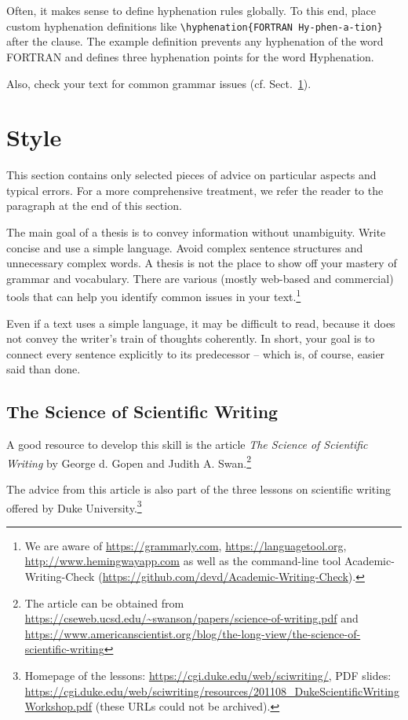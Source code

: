 Often, it makes sense to define hyphenation rules globally. To this end, place custom hyphenation definitions like \verb|\hyphenation{FORTRAN Hy-phen-a-tion}| after the \verb|| clause. The example definition prevents any hyphenation of the word FORTRAN and defines three hyphenation points for the word Hyphenation.

Also, check your text for common grammar issues (cf. Sect.~\ref{sec:style}).

\section{Style}
\label{sec:style}

This section contains only selected pieces of advice on particular aspects and typical errors. For a more comprehensive treatment, we refer the reader to the paragraph  at the end of this section.

The main goal of a thesis is to convey information without unambiguity. Write concise and use a simple language. Avoid complex sentence structures and unnecessary complex words. A thesis is not the place to show off your mastery of grammar and vocabulary. There are various (mostly web-based and commercial) tools that can help you identify common issues in your text.\footnote{We are aware of \url{https://grammarly.com}, \url{https://languagetool.org}, \url{http://www.hemingwayapp.com} as well as the command-line tool Academic-Writing-Check (\url{https://github.com/devd/Academic-Writing-Check}).}

Even if a text uses a simple language, it may be difficult to read, because it does not convey the writer's train of thoughts coherently. In short, your goal is to connect every sentence explicitly to its predecessor – which is, of course, easier said than done.

\subsection{The Science of Scientific Writing}

A good resource to develop this skill is the article \emph{The Science of Scientific Writing} by George d. Gopen and Judith A. Swan.\footnote{The article can be obtained from \url{https://cseweb.ucsd.edu/~swanson/papers/science-of-writing.pdf} and \url{https://www.americanscientist.org/blog/the-long-view/the-science-of-scientific-writing}} 

The advice from this article is also part of the three lessons on scientific writing offered by Duke University.\footnote{Homepage of the lessons: \url{https://cgi.duke.edu/web/sciwriting/}, PDF slides: \url{https://cgi.duke.edu/web/sciwriting/resources/201108_DukeScientificWritingWorkshop.pdf} (these URLs could not be archived).}

